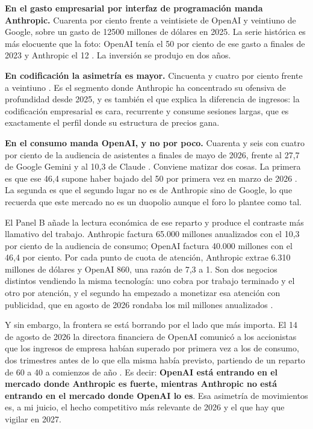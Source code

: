 \documentclass[11pt,letterpaper]{article}
\begin{document}
\textbf{En el gasto empresarial por interfaz de programación manda Anthropic.}
Cuarenta por ciento frente a veintisiete de OpenAI y veintiuno de Google, sobre
un gasto de \num{12500} millones de dólares en 2025. La serie histórica es más
elocuente que la foto: OpenAI tenía el 50 por ciento de ese gasto a finales de
2023 y Anthropic el 12 \parencite{menlo2025}. La inversión se produjo en dos
años.

\textbf{En codificación la asimetría es mayor.} Cincuenta y cuatro por ciento
frente a veintiuno \parencite{menlo2025}. Es el segmento donde Anthropic ha
concentrado su ofensiva de profundidad desde 2025, y es también el que explica
la diferencia de ingresos: la codificación empresarial es cara, recurrente y
consume sesiones largas, que es exactamente el perfil donde su estructura de
precios gana.

\textbf{En el consumo manda OpenAI, y no por poco.} Cuarenta y seis con cuatro
por ciento de la audiencia de asistentes a finales de mayo de 2026, frente al
27,7 de Google Gemini y al 10,3 de Claude \parencite{sensortower2026}. Conviene
matizar dos cosas. La primera es que ese 46,4 supone haber bajado del 50 por
primera vez en marzo de 2026 \parencite{techcrunch2026cuota}. La segunda es que
el segundo lugar no es de Anthropic sino de Google, lo que recuerda que este
mercado no es un duopolio aunque el foro lo plantee como tal.

El Panel B añade la lectura económica de ese reparto y produce el contraste más
llamativo del trabajo. Anthropic factura 65.000 millones anualizados con el 10,3
por ciento de la audiencia de consumo; OpenAI factura 40.000 millones con el
46,4 por ciento. Por cada punto de cuota de atención, Anthropic extrae 6.310
millones de dólares y OpenAI 860, una razón de 7,3 a 1. Son dos negocios
distintos vendiendo la misma tecnología: uno cobra por trabajo terminado y el
otro por atención, y el segundo ha empezado a monetizar esa atención con
publicidad, que en agosto de 2026 rondaba los mil millones anualizados
\parencite{tnw2026friar}.

Y sin embargo, la frontera se está borrando por el lado que más importa. El 14 de
agosto de 2026 la directora financiera de OpenAI comunicó a los accionistas que
los ingresos de empresa habían superado por primera vez a los de consumo, dos
trimestres antes de lo que ella misma había previsto, partiendo de un reparto de
60 a 40 a comienzos de año \parencite{tnw2026friar}. Es decir: \textbf{OpenAI está
entrando en el mercado donde Anthropic es fuerte, mientras Anthropic no está
entrando en el mercado donde OpenAI lo es}. Esa asimetría de movimientos es, a mi
juicio, el hecho competitivo más relevante de 2026 y el que hay que vigilar en
2027.
\end{document}
